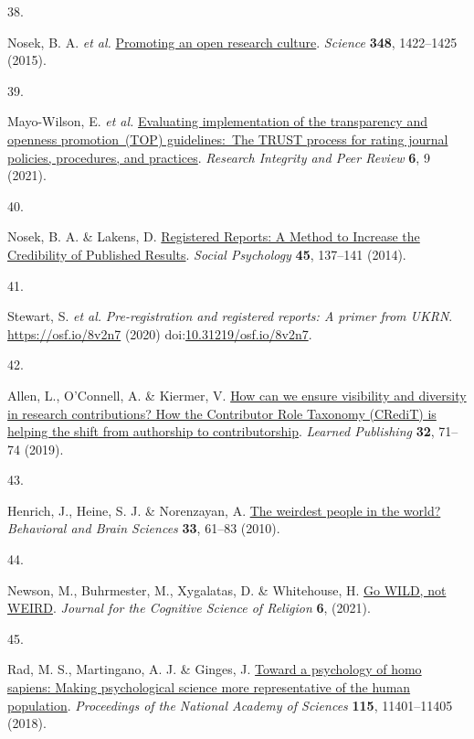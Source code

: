 \documentclass[
  man,floatsintext]{apa6}
\newlength{\cslhangindent}
\newlength{\csllabelwidth}
\newlength{\cslentryspacingunit} %
\newenvironment{CSLReferences}[2] %
 {%
  \setlength{\parindent}{0pt}
  \ifodd #1
  \let\oldpar\par
  \def\par{\hangindent=\cslhangindent\oldpar}
  \fi
  \setlength{\parskip}{#2\cslentryspacingunit}
 }%
 {}
\newcommand{\CSLLeftMargin}[1]{\parbox[t]{\csllabelwidth}{#1}}
\newcommand{\CSLRightInline}[1]{\parbox[t]{\linewidth - \csllabelwidth}{#1}\break}
\begin{document}
\begin{CSLReferences}{0}{0}
\leavevmode{}%
\CSLLeftMargin{38. }%
\CSLRightInline{Nosek, B. A. \emph{et al.} \href{https://doi.org/10.1126/science.aab2374}{Promoting an open research culture}. \emph{Science} \textbf{348}, 1422--1425 (2015).}

\leavevmode{}%
\CSLLeftMargin{39. }%
\CSLRightInline{Mayo-Wilson, E. \emph{et al.} \href{https://doi.org/10.1186/s41073-021-00112-8}{Evaluating implementation of the transparency and openness promotion~(TOP) guidelines:~The TRUST process for rating journal policies, procedures, and practices}. \emph{Research Integrity and Peer Review} \textbf{6}, 9 (2021).}

\leavevmode{}%
\CSLLeftMargin{40. }%
\CSLRightInline{Nosek, B. A. \& Lakens, D. \href{https://doi.org/10.1027/1864-9335/a000192}{Registered Reports: A Method to Increase the Credibility of Published Results}. \emph{Social Psychology} \textbf{45}, 137--141 (2014).}

\leavevmode{}%
\CSLLeftMargin{41. }%
\CSLRightInline{Stewart, S. \emph{et al.} \emph{Pre-registration and registered reports: A primer from UKRN}. \url{https://osf.io/8v2n7} (2020) doi:\href{https://doi.org/10.31219/osf.io/8v2n7}{10.31219/osf.io/8v2n7}.}

\leavevmode{}%
\CSLLeftMargin{42. }%
\CSLRightInline{Allen, L., O'Connell, A. \& Kiermer, V. \href{https://doi.org/10.1002/leap.1210}{How can we ensure visibility and diversity in research contributions? How the Contributor Role Taxonomy (CRediT) is helping the shift from authorship to contributorship}. \emph{Learned Publishing} \textbf{32}, 71--74 (2019).}

\leavevmode{}%
\CSLLeftMargin{43. }%
\CSLRightInline{Henrich, J., Heine, S. J. \& Norenzayan, A. \href{https://doi.org/10.1017/S0140525X0999152X}{The weirdest people in the world?} \emph{Behavioral and Brain Sciences} \textbf{33}, 61--83 (2010).}

\leavevmode{}%
\CSLLeftMargin{44. }%
\CSLRightInline{Newson, M., Buhrmester, M., Xygalatas, D. \& Whitehouse, H. \href{https://doi.org/10.1558/jcsr.38413}{Go WILD, not WEIRD}. \emph{Journal for the Cognitive Science of Religion} \textbf{6}, (2021).}

\leavevmode{}%
\CSLLeftMargin{45. }%
\CSLRightInline{Rad, M. S., Martingano, A. J. \& Ginges, J. \href{https://doi.org/10.1073/pnas.1721165115}{Toward a psychology of homo sapiens: Making psychological science more representative of the human population}. \emph{Proceedings of the National Academy of Sciences} \textbf{115}, 11401--11405 (2018).}


\end{CSLReferences}
\end{document}
